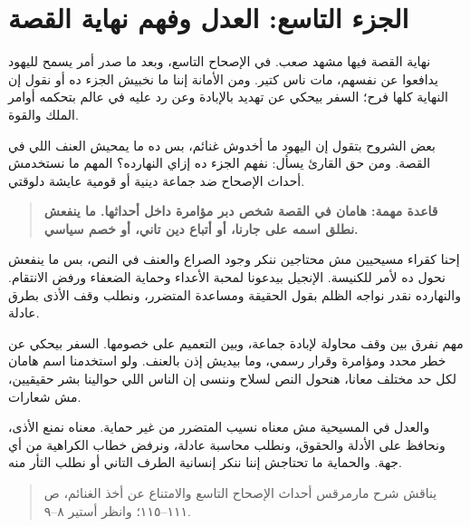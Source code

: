 \documentclass[12pt,a4paper]{article}
\begin{document}
\section*{الجزء التاسع: العدل وفهم نهاية القصة}
نهاية القصة فيها مشهد صعب. في الإصحاح التاسع، وبعد ما صدر أمر يسمح لليهود يدافعوا عن نفسهم، مات ناس كتير. ومن الأمانة إننا ما نخبيش الجزء ده أو نقول إن النهاية كلها فرح؛ السفر بيحكي عن تهديد بالإبادة وعن رد عليه في عالم بتحكمه أوامر الملك والقوة.\par\medskip
بعض الشروح بتقول إن اليهود ما أخدوش غنائم، بس ده ما يمحيش العنف اللي في القصة. ومن حق القارئ يسأل: نفهم الجزء ده إزاي النهارده؟ المهم ما نستخدمش أحداث الإصحاح ضد جماعة دينية أو قومية عايشة دلوقتي.\par\medskip
\begin{quote}\colorbox{soft}{\parbox{0.94\linewidth}{\textbf{قاعدة مهمة: هامان في القصة شخص دبر مؤامرة داخل أحداثها. ما ينفعش نطلق اسمه على جارنا، أو أتباع دين تاني، أو خصم سياسي.}}}\end{quote}
إحنا كقراء مسيحيين مش محتاجين ننكر وجود الصراع والعنف في النص، بس ما ينفعش نحول ده لأمر للكنيسة. الإنجيل بيدعونا لمحبة الأعداء وحماية الضعفاء ورفض الانتقام. والنهارده نقدر نواجه الظلم بقول الحقيقة ومساعدة المتضرر، ونطلب وقف الأذى بطرق عادلة.\par\medskip
مهم نفرق بين وقف محاولة لإبادة جماعة، وبين التعميم على خصومها. السفر بيحكي عن خطر محدد ومؤامرة وقرار رسمي، وما بيديش إذن بالعنف. ولو استخدمنا اسم هامان لكل حد مختلف معانا، هنحول النص لسلاح وننسى إن الناس اللي حوالينا بشر حقيقيين، مش شعارات.\par\medskip
والعدل في المسيحية مش معناه نسيب المتضرر من غير حماية. معناه نمنع الأذى، ونحافظ على الأدلة والحقوق، ونطلب محاسبة عادلة، ونرفض خطاب الكراهية من أي جهة. والحماية ما تحتاجش إننا ننكر إنسانية الطرف التاني أو نطلب الثأر منه.\par\medskip
\begin{quote}\small\color{muted}يناقش شرح مارمرقس أحداث الإصحاح التاسع والامتناع عن أخذ الغنائم، ص ١١١–١١٥؛ وانظر أستير ٨–٩.\end{quote}
\clearpage
\clearpage
\end{document}
